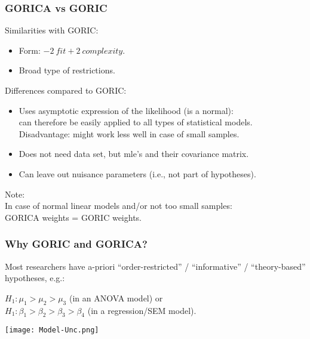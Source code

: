 \documentclass[10pt]{beamer}\usepackage[]{graphicx}\usepackage[]{xcolor}
\begin{document}
\begin{frame}
	\frametitle{GORICA vs GORIC}
	
	Similarities with GORIC:
		\begin{itemize}
			\item Form: $-2 \ fit + 2 \ complexity$.
			\item Broad type of restrictions.
		\end{itemize}
		
		\vspace{.5 cm}
	
	Differences compared to GORIC:
		\begin{itemize}
			\item Uses asymptotic expression of the likelihood (is a normal): \\
			can therefore be easily applied to all types of statistical models. \\
			Disadvantage: might work less well in case of small samples.
			\item Does not need data set, but
			mle's and their covariance matrix.
			\item Can leave out nuisance parameters (i.e., not part of hypotheses).
		\end{itemize}
	
	\vspace{.5 cm}
	
	Note:\\
		In case of normal linear models and/or not too small samples: \\
		GORICA weights = GORIC weights.
\end{frame}
%
\begin{frame}
	\frametitle{Why GORIC and GORICA?}

Most researchers have a-priori ``order-restricted'' / ``informative'' / ``theory-based'' hypotheses, e.g.:

\vspace{.5 cm}

$H_{1}:  \mu_1 > \mu_2 > \mu_3$ (in an ANOVA model) or \\
$H_{1}:  \beta_1 > \beta_2 > \beta_3 > \beta_4$ (in a regression/SEM model). 

\vspace{2\baselineskip}
\texttt{[image: Model-Unc.png]}

\end{frame}
\end{document}
